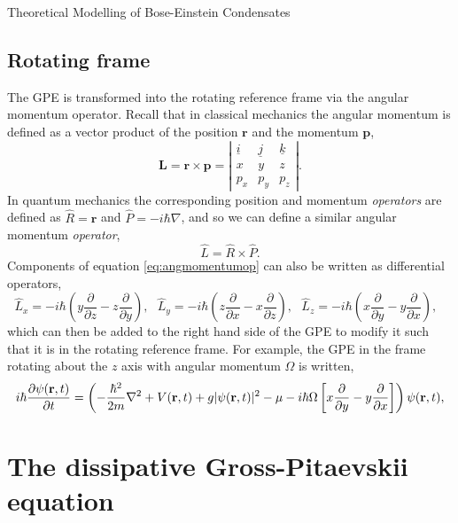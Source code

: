 \begin{chapter}{\label{cha:theoretical_model}Theoretical Modelling of Bose-Einstein Condensates}
	\subsection{\label{section:rotatingframe} Rotating frame}
	The GPE is transformed into the rotating reference frame via the angular momentum operator. Recall that in classical mechanics the angular momentum is defined as a vector product of the position $\mathbf{r}$ and the momentum $\mathbf{p}$,
	\begin{equation*}
		\mathbf{L} = \mathbf{r} \times \mathbf{p} = 
		\left| \begin{array}{ccc}
\underline{i} & \underline{j} & \underline{k} \\
x & y & z \\
p_x & p_y & p_z \end{array} \right|.
	\end{equation*}
	In quantum mechanics the corresponding position and momentum {\it operators} are defined as $\hat{R} = \mathbf{r}$ and $\hat{P} = -i\hbar\nabla$, and so we can define a similar angular momentum {\it operator},
	\begin{equation}\label{eq:angmomentumop}
		\hat{L} = \hat{R} \times \hat{P}.
	\end{equation}
	Components of equation \ref{eq:angmomentumop} can also be written as differential operators,
	\begin{equation}
		\hat{L}_x = -i\hbar\left ( y \frac{\partial}{\partial z} - z \frac{\partial}{\partial y} \right ),~~~
		\hat{L}_y = -i\hbar\left ( z \frac{\partial}{\partial x} - x \frac{\partial}{\partial z} \right ),~~~
		\hat{L}_z = -i\hbar\left ( x \frac{\partial}{\partial y} - y \frac{\partial}{\partial x} \right ),~~~
	\end{equation}
 which can then be added to the right hand side of the GPE to modify it such that it is in the rotating reference frame. For example, the GPE in the frame rotating about the $z$ axis with angular momentum $\Omega$ is written,
	\begin{equation}\label{eq:rotframegpe}
	i\hbar \frac{\partial\psi({\bf r},t)}{\partial t} = \left(-\frac{\hbar^2}{2m}\nabla^2 + V({\bf r},t) + g|\psi({\bf r},t)|^2 - \mu -i\hbar\Omega\left [ x \frac{\partial}{\partial y} - y \frac{\partial}{\partial x} \right ] \right ) \psi({\bf r},t),
	\end{equation}


\section{\label{section:dgpe} The dissipative Gross-Pitaevskii equation}


\end{chapter}
